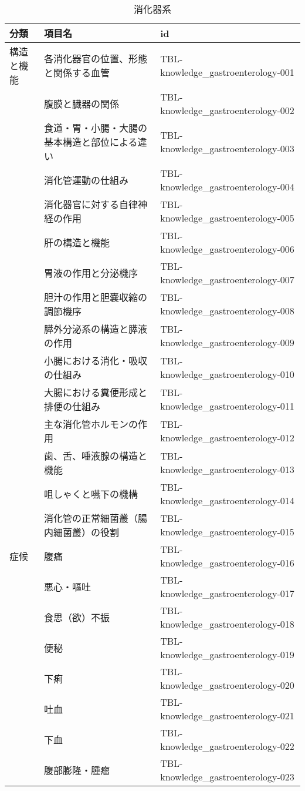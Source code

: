 \begin{xltabular}{\linewidth}{XXX}
\caption{\label{tbl:knowledge_gastroenterology}消化器系} \\
\toprule
分類 & 項目名 & id \\
\midrule
\endhead
構造と機能 & 各消化器官の位置、形態と関係する血管 & TBL-knowledge_gastroenterology-001 \\
 & 腹膜と臓器の関係 & TBL-knowledge_gastroenterology-002 \\
 & 食道・胃・小腸・大腸の基本構造と部位による違い & TBL-knowledge_gastroenterology-003 \\
 & 消化管運動の仕組み & TBL-knowledge_gastroenterology-004 \\
 & 消化器官に対する自律神経の作用 & TBL-knowledge_gastroenterology-005 \\
 & 肝の構造と機能 & TBL-knowledge_gastroenterology-006 \\
 & 胃液の作用と分泌機序 & TBL-knowledge_gastroenterology-007 \\
 & 胆汁の作用と胆嚢収縮の調節機序 & TBL-knowledge_gastroenterology-008 \\
 & 膵外分泌系の構造と膵液の作用 & TBL-knowledge_gastroenterology-009 \\
 & 小腸における消化・吸収の仕組み & TBL-knowledge_gastroenterology-010 \\
 & 大腸における糞便形成と排便の仕組み & TBL-knowledge_gastroenterology-011 \\
 & 主な消化管ホルモンの作用 & TBL-knowledge_gastroenterology-012 \\
 & 歯、舌、唾液腺の構造と機能 & TBL-knowledge_gastroenterology-013 \\
 & 咀しゃくと嚥下の機構 & TBL-knowledge_gastroenterology-014 \\
 & 消化管の正常細菌叢（腸内細菌叢）の役割 & TBL-knowledge_gastroenterology-015 \\
症候 & 腹痛 & TBL-knowledge_gastroenterology-016 \\
 & 悪心・嘔吐 & TBL-knowledge_gastroenterology-017 \\
 & 食思（欲）不振 & TBL-knowledge_gastroenterology-018 \\
 & 便秘 & TBL-knowledge_gastroenterology-019 \\
 & 下痢 & TBL-knowledge_gastroenterology-020 \\
 & 吐血 & TBL-knowledge_gastroenterology-021 \\
 & 下血 & TBL-knowledge_gastroenterology-022 \\
 & 腹部膨隆・腫瘤 & TBL-knowledge_gastroenterology-023 \\

\end{xltabular}

